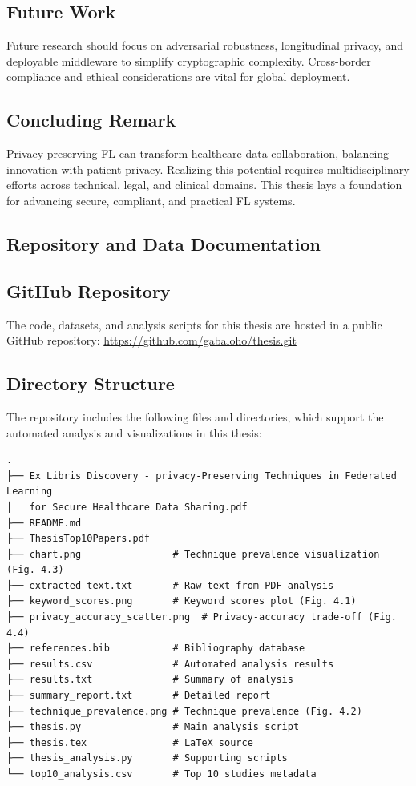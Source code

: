 \documentclass[12pt]{report}
\begin{document}
{\section{Future Work}
Future research should focus on adversarial robustness, longitudinal privacy, and deployable middleware to simplify cryptographic complexity. Cross-border compliance and ethical considerations are vital for global deployment.

\section{Concluding Remark}
Privacy-preserving FL can transform healthcare data collaboration, balancing innovation with patient privacy. Realizing this potential requires multidisciplinary efforts across technical, legal, and clinical domains. This thesis lays a foundation for advancing secure, compliant, and practical FL systems.

\begin{appendix}
\chapter{Repository and Data Documentation}
\label{app:repo}

\section{GitHub Repository}
The code, datasets, and analysis scripts for this thesis are hosted in a public GitHub repository:  
\url{https://github.com/gabaloho/thesis.git}

\section{Directory Structure}
The repository includes the following files and directories, which support the automated analysis and visualizations in this thesis:

\begin{verbatim}
.
├── Ex Libris Discovery - privacy-Preserving Techniques in Federated Learning 
│   for Secure Healthcare Data Sharing.pdf
├── README.md
├── ThesisTop10Papers.pdf
├── chart.png                # Technique prevalence visualization (Fig. 4.3)
├── extracted_text.txt       # Raw text from PDF analysis
├── keyword_scores.png       # Keyword scores plot (Fig. 4.1)
├── privacy_accuracy_scatter.png  # Privacy-accuracy trade-off (Fig. 4.4)
├── references.bib           # Bibliography database
├── results.csv              # Automated analysis results
├── results.txt              # Summary of analysis
├── summary_report.txt       # Detailed report
├── technique_prevalence.png # Technique prevalence (Fig. 4.2)
├── thesis.py                # Main analysis script
├── thesis.tex               # LaTeX source
├── thesis_analysis.py       # Supporting scripts
└── top10_analysis.csv       # Top 10 studies metadata
\end{verbatim}


\end{appendix}}
\end{document}

